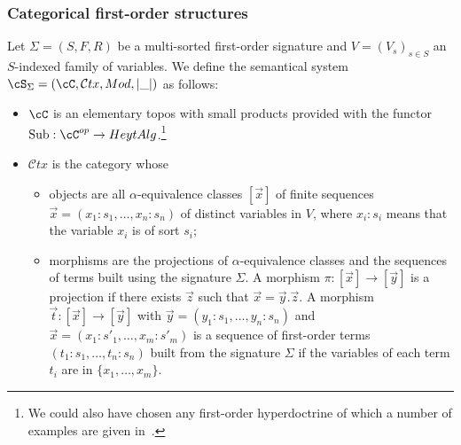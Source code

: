 \documentclass[preprint,3p,times]{elsarticle}
\newcommand{\Sub}{\mathrm{Sub}}
\newcommand{\Ctx}{\mathcal{C}tx}
\newcommand{\Heytalg}{HeytAlg}
\begin{document}
\subsubsection{Categorical first-order structures}
\label{fol-semanticalsystem}

Let $\Sigma = (S,F,R)$ be a multi-sorted first-order signature and \(V = (V_s)_{s \in S}\) an \(S\)-indexed family of variables. We define the semantical system $\cS_\Sigma = (\cC,\Ctx,Mod,|\_|)$ as follows:

\begin{itemize}

	\item $\cC$ is an elementary topos with small products provided with the functor \(\Sub : \cC^{op} \to \Heytalg\).\footnote{We could also have chosen any first-order hyperdoctrine of which a number of examples are given in~\cite{Pit02}.}

 
    \item $\Ctx$ is the category whose
		\begin{itemize}
			\item objects are all $\alpha$-equivalence classes $[\vec{x}]$ of finite sequences $\vec{x} = (x_1:s_1,\ldots,x_n:s_n)$ of distinct variables in \(V\), where $x_i:s_i$ means that the variable $x_i$ is of sort $s_i$;
   
			\item morphisms are the projections of $\alpha$-equivalence classes and the sequences of terms built using the signature \(\Sigma\). A morphism $\pi : [\vec{x}] \to [\vec{y}]$ is a projection if there exists $\vec{z}$ such that $\vec{x} = \vec{y}.\vec{z}$. A morphism $\vec{t} : [\vec{x}] \to [\vec{y}]$ with \(\vec{y} = (y_1:s_1,\ldots,y_n:s_n)\) and \(\vec{x} = (x_1:s'_1,\ldots,x_m:s'_m)\) is a sequence of first-order terms $(t_1:s_1,\ldots,t_n:s_n)$ built from the signature \(\Sigma\) if the variables of each term $t_i$ are in $\{x_1, \ldots, x_m\}$. 
		\end{itemize}


\end{itemize}
\end{document}
